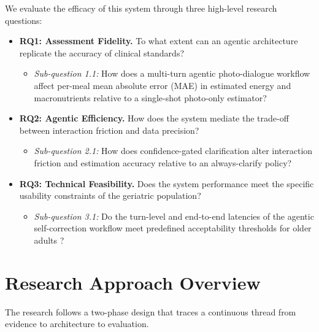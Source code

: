We evaluate the efficacy of this system through three high-level research questions:

\begin{itemize}
    \item \textbf{RQ1: Assessment Fidelity.} To what extent can an agentic architecture replicate the accuracy of clinical standards?
    \begin{itemize}
        \item \emph{Sub-question 1.1:} How does a multi-turn agentic photo-dialogue workflow affect per-meal mean absolute error (MAE) in estimated energy and macronutrients relative to a single-shot photo-only estimator?
    \end{itemize}

    \item \textbf{RQ2: Agentic Efficiency.} How does the system mediate the trade-off between interaction friction and data precision?
    \begin{itemize}
        \item \emph{Sub-question 2.1:} How does confidence-gated clarification alter interaction friction and estimation accuracy relative to an always-clarify policy?
    \end{itemize}

    \item \textbf{RQ3: Technical Feasibility.} Does the system performance meet the specific usability constraints of the geriatric population?
    \begin{itemize}
        \item \emph{Sub-question 3.1:} Do the turn-level and end-to-end latencies of the agentic self-correction workflow meet predefined acceptability thresholds for older adults \citep{nielsenUsabilityEngineering1994,nahStudyTolerableWaiting2004}?
    \end{itemize}
\end{itemize}

\section{Research Approach Overview}

The research follows a two-phase design that traces a continuous thread from evidence to architecture to evaluation.

